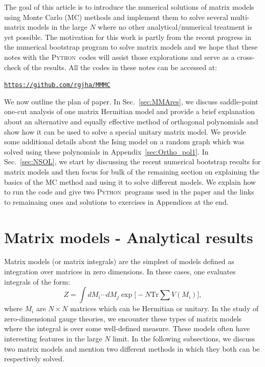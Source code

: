 \documentclass[letter,11pt]{article}
\newcommand{\PY}{\textsc{Python}}
\begin{document}
The goal of this article is to introduce the numerical solutions of matrix models using Monte Carlo (MC) methods and implement them to solve several multi-matrix 
models in the large $N$ where no other analytical/numerical treatment is yet possible. The motivation for this work is partly from the recent progress in the numerical bootstrap program to solve matrix models and we hope that these notes with the \PY~codes will assist those explorations and serve as a cross-check of the results. All the codes in these notes can be accessed at:  
\begin{center} \texttt{\href{https://github.com/rgjha/MMMC}{https://github.com/rgjha/MMMC}} \end{center}
We now outline the plan of paper. In Sec.~\ref{sec:MMAres}, we discuss saddle-point one-cut analysis of one matrix Hermitian model and provide a brief explanation about an alternative and equally effective method of orthogonal polynomials and show how it can be used to 
solve a special unitary matrix model. We provide some additional details about the Ising model on a random graph which was solved using these polynomials in Appendix~\ref{sec:Ortho_pol1}. 
In Sec.~\ref{sec:NSOL}, we start by discussing the recent numerical bootstrap results for matrix models and then focus for bulk of the remaining section on explaining the basics of the MC method and using it to solve different models. We explain how to run the code and give two  \PY~programs used in the paper and the links to remainaing ones and solutions to exercises in Appendices at the end.

\section{\label{sec:MMAres}Matrix models - Analytical results} 
Matrix models (or matrix integrals) are the simplest of models 
defined as integration over matrices in zero dimensions. 
In these cases, one evaluates integrals of the form:
\begin{equation}
Z = \int dM_{i} \cdots dM_{j} \exp\Bigg[-N \mathrm{Tr} \sum V(M_{i})\Bigg] ,
\end{equation}
where $M_{i}$ are $N \times N$ matrices which can be Hermitian or unitary.  
In the study of zero-dimensional gauge theories, we encounter these types of matrix models 
where the integral is over some well-defined measure. These models often have interesting features in the 
large $N$ limit. In the following subsections, we discuss two matrix models and mention two different methods in which they both can be respectively solved.
\end{document}
